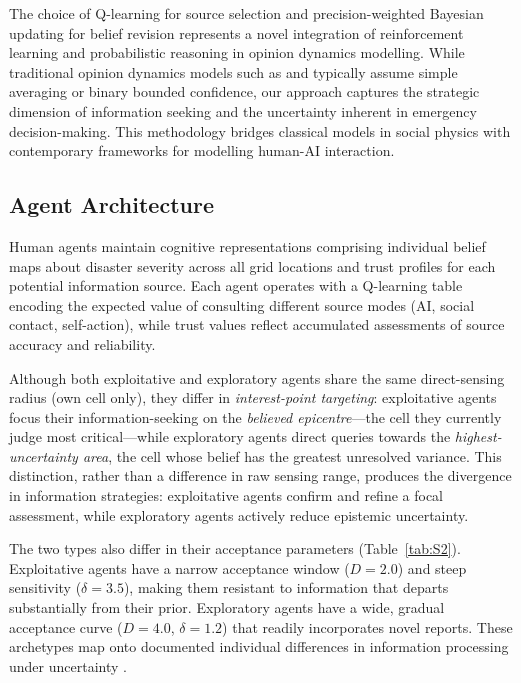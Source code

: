 The choice of Q-learning for source selection and precision-weighted Bayesian updating
for belief revision represents a novel integration of reinforcement learning and
probabilistic reasoning in opinion dynamics modelling.
While traditional opinion dynamics models such as \citet{deffuant2000mixing} and
\citet{hegselmann2002opinion} typically assume simple averaging or binary bounded
confidence, our approach captures the strategic dimension of information seeking and
the uncertainty inherent in emergency decision-making.
This methodology bridges classical models in social physics with contemporary
frameworks for modelling human-AI interaction.

\subsection{Agent Architecture}

Human agents maintain cognitive representations comprising individual belief maps
about disaster severity across all grid locations and trust profiles for each
potential information source.
Each agent operates with a Q-learning table encoding the expected value of
consulting different source modes (AI, social contact, self-action), while trust
values reflect accumulated assessments of source accuracy and reliability.

Although both exploitative and exploratory agents share the same direct-sensing
radius (own cell only), they differ in \emph{interest-point targeting}: exploitative
agents focus their information-seeking on the \emph{believed epicentre}---the
cell they currently judge most critical---while exploratory agents direct queries
towards the \emph{highest-uncertainty area}, the cell whose belief has the greatest
unresolved variance.
This distinction, rather than a difference in raw sensing range, produces the
divergence in information strategies: exploitative agents confirm and refine a focal
assessment, while exploratory agents actively reduce epistemic uncertainty.

The two types also differ in their acceptance parameters (Table~\ref{tab:S2}).
Exploitative agents have a narrow acceptance window ($D=2.0$) and steep
sensitivity ($\delta=3.5$), making them resistant to information that departs
substantially from their prior.
Exploratory agents have a wide, gradual acceptance curve ($D=4.0$, $\delta=1.2$)
that readily incorporates novel reports.
These archetypes map onto documented individual differences in information
processing under uncertainty \citep{HertwigEngel2016,March1991}.

